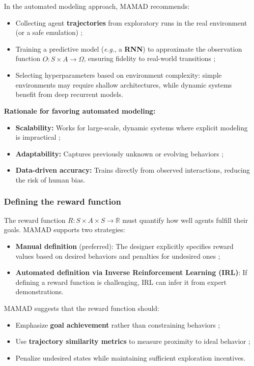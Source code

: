 \documentclass[pdflatex,sn-mathphys-num]{sn-jnl}%
\theoremstyle{thmstyleone}%
\theoremstyle{thmstyletwo}%
\theoremstyle{thmstylethree}%
\begin{document}
In the automated modeling approach, MAMAD recommends:
\begin{itemize}
    \item Collecting agent \textbf{trajectories} from exploratory runs in the real environment (or a safe emulation) ;
    \item Training a predictive model (\textit{e.g.}, a \textbf{RNN}) to approximate the observation function $\hat{O}: S \times A \to \Omega$, ensuring fidelity to real-world transitions ;
    \item Selecting hyperparameters based on environment complexity: simple environments may require shallow architectures, while dynamic systems benefit from deep recurrent models.
\end{itemize}

\noindent \textbf{Rationale for favoring automated modeling:}
\begin{itemize}
    \item \textbf{Scalability:} Works for large-scale, dynamic systems where explicit modeling is impractical ;
    \item \textbf{Adaptability:} Captures previously unknown or evolving behaviors ;
    \item \textbf{Data-driven accuracy:} Trains directly from observed interactions, reducing the risk of human bias.
\end{itemize}

\subsubsection{Defining the reward function}
The reward function $R: S \times A \times S \to \mathbb{R}$ must quantify how well agents fulfill their goals. MAMAD supports two strategies:
\begin{itemize}
    \item \textbf{Manual definition} (preferred): The designer explicitly specifies reward values based on desired behaviors and penalties for undesired ones ;
    \item \textbf{Automated definition via Inverse Reinforcement Learning (IRL)}: If defining a reward function is challenging, IRL can infer it from expert demonstrations.
\end{itemize}

MAMAD suggests that the reward function should:
\begin{itemize}
    \item Emphasize \textbf{goal achievement} rather than constraining behaviors ;
    \item Use \textbf{trajectory similarity metrics} to measure proximity to ideal behavior ;
    \item Penalize undesired states while maintaining sufficient exploration incentives.
\end{itemize}
\end{document}
